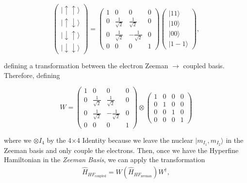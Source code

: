 \documentclass[svgnames]{article}
\begin{document}
 \[
\begin{pmatrix}
  |\uparrow \uparrow\rangle \\ |\uparrow\downarrow\rangle \\ |\downarrow
  \uparrow\rangle \\ |\downarrow\downarrow\rangle
\end{pmatrix} = \begin{pmatrix}
1 & 0 & 0 & 0 \\ 
0 & \frac{1}{\sqrt{2}} & \frac{1}{\sqrt{2}} & 0 \\ 
0 & \frac{1}{\sqrt{2}} & -\frac{1}{\sqrt{2}} & 0 \\ 
0 & 0 & 0 & 1 
\end{pmatrix}  \begin{pmatrix}
    |11\rangle \\ |10\rangle \\ |00\rangle \\ |1-1\rangle
\end{pmatrix},
\] \vspace{3px}

defining a transformation between the electron Zeeman $\to$ coupled basis.
Therefore, defining 

\[
 W = \begin{pmatrix}
     1 & 0 & 0 & 0 \\ 
     0 & \frac{1}{\sqrt{2}} & \frac{1}{\sqrt{2}} & 0 \\ 
     0 & \frac{1}{\sqrt{2}} & -\frac{1}{\sqrt{2}} & 0 \\ 
     0 & 0 & 0 & 1 
 \end{pmatrix} \otimes \begin{pmatrix}
     1 & 0 & 0 & 0 \\ 
     0 & 1 & 0 & 0 \\ 
     0 & 0 & 1 & 0 \\ 
     0 & 0 & 0 & 1 
 \end{pmatrix} 
\] \vspace{3px}

where we $\otimes I_4$ by the 4$\times$4 Identity because we leave the nuclear
$|m_{I_1}, m_{I_2}\rangle$ in the Zeeman basis and only couple the electrons.
Then, once we have the Hyperfine Hamiltonian in the \textit{Zeeman Basis}, we
can apply the transformation 
\begin{align}\label{cg} 
    \hat{H}_{HF_\text{coupled}} = W \left( \hat{H}_{HF_\text{zeeman} } \right)
    W^\dagger,  
\end{align} \vspace{3px}
\end{document}
